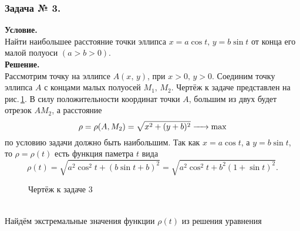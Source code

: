 \subsubsection*{\center Задача № 3.}
{\bf Условие.~}\\
Найти наибольшее расстояние точки эллипса $x=a\cos{t},\,y=b\sin{t}$ от конца
его малой полуоси $(a>b>0)$.\\
{\bf Решение.~}\\
Рассмотрим точку на эллипсе $A(x,\,y)$, при $x>0,\,y>0$. Соединим точку эллипса $A$ 
с концами малых полуосей $M_1,\,M_2$. Чертёж к задаче представлен на рис.\,\ref{fig:01}.
В силу положительности координат точки $A$, большим из двух будет отрезок $AM_2$, а расстояние
$$
\rho = \rho(A,M_2) = \sqrt{x^2 + (y+b)^2} \xrightarrow{\hphantom{aaa} } \max
$$
по условию задачи должно быть наибольшим.
Так как $x=a\cos{t}$, а $y=b\sin{t}$, то $\rho=\rho(t)$ есть функция паметра $t$ вида
$$
\rho(t) = \sqrt{a^2\cos^2{t} + (b\sin{t}+b)^2} = \sqrt{a^2\cos^2{t} + b^2(1 + \sin{t})^2}.
$$
\begin{figure}[th!]
	\center
	\caption{Чертёж к задаче 3}
	\label{fig:01}
\end{figure}\\
Найдём экстремальные значения функции $\rho(t)$ из решения уравнения

